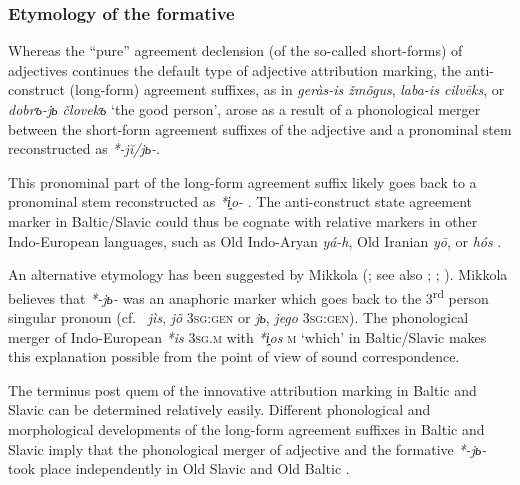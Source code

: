 \subsubsection{Etymology of the formative} 
Whereas the “pure” agreement declension (of the so-called short-forms) of adjectives continues the  default type of adjective attribution marking, the anti\hyp{}construct (long-form) agreement suffixes, as in  \textit{geràs-is žmõgus},  \textit{laba-is cilvēks}, or  \textit{dobrъ-jь človekъ} ‘the good person’, arose as a result of a phonological merger between the short-form agreement suffixes of the adjective and a pronominal stem reconstructed as  \textit{*-jĭ/jь-}.

This pronominal part of the long-form agreement suffix likely goes back to a pronominal stem reconstructed as  \textit{*i̭o-} \citep[61]{wissemann1958}. The anti\hyp{}construct state agreement marker in Baltic\slash{}Slavic could thus be cognate with relative markers in other Indo-European languages, such as Old Indo-Aryan \textit{yá-h}, Old Iranian \textit{yō}, or  \textit{hós} \citep[53]{heinrichs1954}.

An alternative etymology has been suggested by Mikkola (\citeyear[52]{mikkola1950}; %
 see also \citealt[102]{leskien1871}; \citealt[164–165]{leskien1919}; \citealt[19ff.]{wijk1935}). Mikkola believes that  \textit{*-jь-} was an anaphoric marker which goes back to the 3\textsuperscript{rd} person singular pronoun (cf.~ \textit{jìs}, \textit{jõ} \textsc{3sg:gen} or  \textit{jь}, \textit{jego} \textsc{3sg:gen}). The phonological merger of Indo-European \textit{*is} \textsc{3sg.m} with \textit{\textit{*i̭os}} \textsc{m} ‘which’ in Baltic\slash{}Slavic \citep[21 Footnote 8]{schmidt1959} makes this explanation possible from the point of view of sound correspondence.

The terminus post quem of the innovative attribution marking in Baltic and Slavic can be determined relatively easily. Different phonological and morphological developments of the long-form agreement suffixes in Baltic and Slavic imply that the phonological merger of adjective and the formative \textit{*-jь-} took place independently in Old Slavic and Old Baltic \citep[64–65]{koch1992}. 

